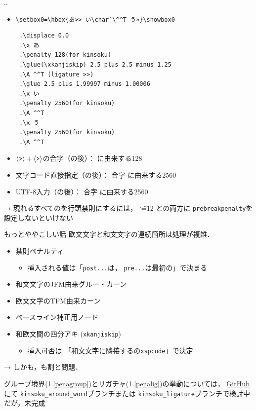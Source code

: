 \documentclass[a5paper,dvipdfmx,14pt]{beamer}
\def\cs#1{\texttt{\char92\nobreak#1}}
\begin{document}
\begin{frame}[fragile]{\insertsectionnumber.\insertsubsectionnumber. \insertsubsection}{}
{\footnotesize\def\verbnotesize{\scriptsize}
\begin{itemize}
  \item \verb+\setbox0=\hbox{あ>> い\char`\^^T う»}\showbox0+
\begin{verbnote}
\begin{verbatim}
 .\displace 0.0
 .\x あ
 .\penalty 128(for kinsoku)
 .\glue(\xkanjiskip) 2.5 plus 2.5 minus 1.25
 .\A ^^T (ligature >>)
 .\glue 2.5 plus 1.99997 minus 1.00006
 .\x い
 .\penalty 2560(for kinsoku)
 .\A ^^T
 .\x う
 .\penalty 2560(for kinsoku)
 .\A ^^T
\end{verbatim}
\end{verbnote}
\end{itemize}\vskip-20pt
\begin{itemize}
  \item $\langle\mbox{\texttt{>}}\rangle+\langle\mbox{\texttt{>}}\rangle$の合字（の後）：
     \codechar{>} に由来する128
  \item 文字コード直接指定（の後）：
    {\color{blue}合字} \codechar{>>} に由来する2560
  \item UTF-8入力（の後）：
    {\color{blue}合字} \codechar{>>} に由来する2560
\end{itemize}
→ 現れるすべてのを行頭禁則にするには，
{\catcode`\^=12 \codechar{>}と}の両方に
\cs{prebreakpenalty}を設定しないといけない\SUSHI
}
\end{frame}

\begin{frame}[fragile]{もっとややこしい話}
欧文文字と和文文字の連続箇所は処理が複雑．
\begin{itemize}\small
  \item 禁則ペナルティ
    \begin{itemize}\footnotesize\leftskip-10pt
      \item 挿入される値は「\cs{post...}は，
        \cs{pre...}は最初の」で決まる{\SUSHI}
    \end{itemize}
  \item 和文文字のJFM由来グルー・カーン
  \item 欧文文字のTFM由来カーン
  \item ベースライン補正用ノード
  \item 和欧文間の四分アキ (\cs{xkanjiskip})
    \begin{itemize}\footnotesize\leftskip-10pt
      \item 挿入可否は
        「和文文字に隣接するの\cs{xspcode}」で決定{\SUSHI}
    \end{itemize}
\end{itemize}
{\small → しかも，も割と問題．}\par\medskip
{\footnotesize
グループ境界(1.\ref{penagroup})とリガチャ(1.\ref{penalig})の挙動については，
\href{https://github.com/texjporg/tex-jp-build/issues/85}{GitHub}にて
\verb+kinsoku_around_word+ブランチまたは
\verb+kinsoku_ligature+ブランチで検討中だが，未完成
}
\end{frame}
\end{document}
